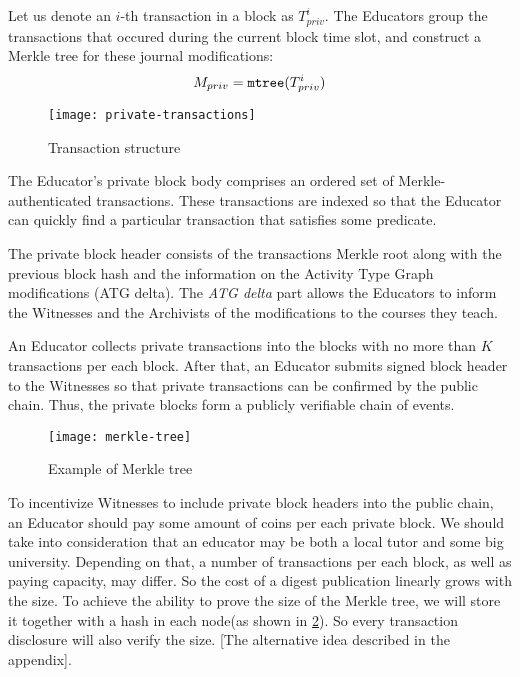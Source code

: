 Let us denote an $i$-th transaction in a block as $T_{priv}^i$. The Educators group the transactions that occured during the current block time slot, and construct a Merkle tree \cite{merkle1989certified} for these journal modifications:
\begin{equation}
M_{priv} = \mathtt{mtree}(T_{priv}^i)
\end{equation}

\begin{figure}[ht]
\centering
\texttt{[image: private-transactions]}
\caption{Transaction structure}
\label{fig:private-transactions}
\end{figure}



The Educator's private block body comprises an ordered set of Merkle-authenticated transactions. These transactions are indexed so that the Educator can quickly find a particular transaction that satisfies some predicate.

The private block header consists of the transactions Merkle root along with the previous block hash and the information on the Activity Type Graph modifications (ATG delta). The \textit{ATG delta} part allows the Educators to inform the Witnesses and the Archivists of the modifications to the courses they teach.

An Educator collects private transactions into the blocks with no more than $K$ transactions per each block. After that, an Educator submits signed block header to the Witnesses so that private transactions can be confirmed by the public chain. Thus, the private blocks form a publicly verifiable chain of events.


\begin{figure}[ht]
\centering
\texttt{[image: merkle-tree]}
\caption{Example of Merkle tree}
\label{fig:merkle-tree}
\end{figure}



To incentivize Witnesses to include private block headers into the public chain, an Educator should pay some amount of coins per each private block. We should take into consideration that an educator may be both a local tutor and some big university. Depending on that, a number of transactions per each block, as well as paying capacity, may differ. So the cost of a digest publication linearly grows with the size. To achieve the ability to prove the size of the Merkle tree, we will store it together with a hash in each node(as shown in \ref{fig:merkle-tree}). So every transaction disclosure will also verify the size. [The alternative idea described in the appendix].


